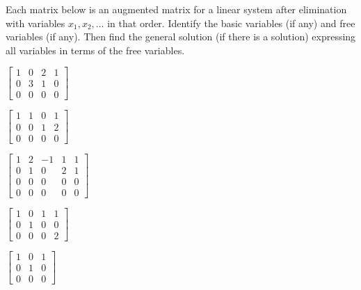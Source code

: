 \begin{activity}
Each matrix below is an augmented matrix for a linear system after elimination with variables $x_1, x_2, \ldots$ in that order. Identify the basic variables (if any) and free variables (if any). Then find the general solution (if there is a solution) expressing all variables in terms of the free variables. 
	\ba
	\begin{minipage}{1.5in}
	\item $\left[ \begin{array}{ccc|c} 1&0&2&1 \\ 0&3&1&0 \\ 0&0&0&0 \end{array} \right]$
	\end{minipage}
	\begin{minipage}{1.5in}
	\item $\left[ \begin{array}{ccr|c} 1&1&0&1 \\ 0&0&1&2 \\ 0&0&0&0 \end{array} \right]$
	\end{minipage}
	\begin{minipage}{1.5in}
	\item $\left[ \begin{array}{ccrc|c} 1&2&-1&1&1 \\ 0&1&0&2&1 \\ 0&0&0&0&0 \\ 0&0&0&0&0 \end{array} \right]$
	\end{minipage}

	\begin{minipage}{1.5in}
	\item $\left[ \begin{array}{ccr|c} 1&0&1&1 \\ 0&1&0&0 \\ 0&0&0&2 \end{array} \right]$
	\end{minipage}
	\begin{minipage}{1.5in}
	\item $\left[ \begin{array}{cc|c} 1&0&1 \\ 0&1&0 \\ 0&0&0 \end{array} \right]$
	\end{minipage}

\ea

\end{activity}


